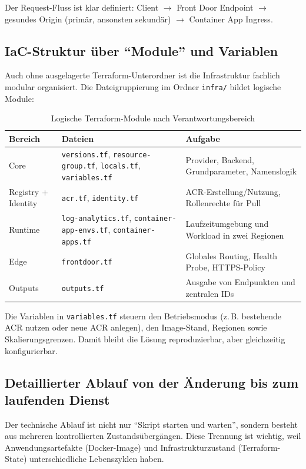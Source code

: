 \documentclass[a4paper,11pt]{article}
\begin{document}
Der Request-Fluss ist klar definiert: Client $\rightarrow$ Front Door Endpoint $\rightarrow$ gesundes Origin (primär, ansonsten sekundär) $\rightarrow$ Container App Ingress.

\subsection{IaC-Struktur über ``Module'' und Variablen}
Auch ohne ausgelagerte Terraform-Unterordner ist die Infrastruktur fachlich modular organisiert. Die Dateigruppierung im Ordner \texttt{infra/} bildet logische Module:

\begin{table}[H]
\centering
\caption{Logische Terraform-Module nach Verantwortungsbereich}
\begin{tabular}{p{}p{}p{}}
\toprule
\textbf{Bereich} & \textbf{Dateien} & \textbf{Aufgabe} \\
\midrule
Core & \texttt{versions.tf}, \texttt{resource-group.tf}, \texttt{locals.tf}, \texttt{variables.tf} & Provider, Backend, Grundparameter, Namenslogik \\
Registry + Identity & \texttt{acr.tf}, \texttt{identity.tf} & ACR-Erstellung/Nutzung, Rollenrechte für Pull \\
Runtime & \texttt{log-analytics.tf}, \texttt{container-app-envs.tf}, \texttt{container-apps.tf} & Laufzeitumgebung und Workload in zwei Regionen \\
Edge & \texttt{frontdoor.tf} & Globales Routing, Health Probe, HTTPS-Policy \\
Outputs & \texttt{outputs.tf} & Ausgabe von Endpunkten und zentralen IDs \\
\bottomrule
\end{tabular}
\end{table}

Die Variablen in \texttt{variables.tf} steuern den Betriebsmodus (z.\,B. bestehende ACR nutzen oder neue ACR anlegen), den Image-Stand, Regionen sowie Skalierungsgrenzen. Damit bleibt die Lösung reproduzierbar, aber gleichzeitig konfigurierbar.

\subsection{Detaillierter Ablauf von der Änderung bis zum laufenden Dienst}
Der technische Ablauf ist nicht nur ``Skript starten und warten'', sondern besteht aus mehreren kontrollierten Zustandsübergängen. Diese Trennung ist wichtig, weil Anwendungsartefakte (Docker-Image) und Infrastrukturzustand (Terraform-State) unterschiedliche Lebenszyklen haben.
\end{document}
